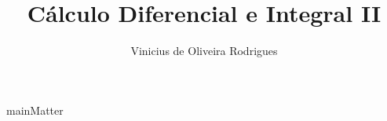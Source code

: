 \documentclass{book}
\author{Vinicius de Oliveira Rodrigues}
\title{Cálculo Diferencial e Integral II}
\begin{document}
\maketitle

\frontmatter
\tableofcontents
\mainmatter
{mainMatter}
\appendix
\backmatter
\printindex
\end{document}
